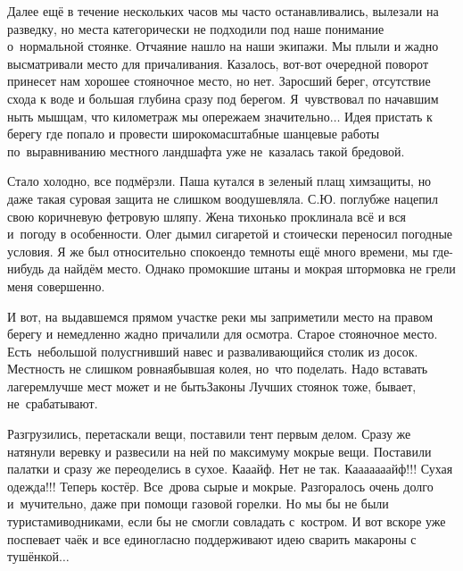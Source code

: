 
Далее ещё в течение нескольких часов мы часто останавливались, вылезали на разведку, но места категорически не подходили под наше понимание о~нормальной стоянке. Отчаяние нашло на наши экипажи. Мы плыли и жадно высматривали место для причаливания. Казалось, вот-вот очередной поворот принесет нам хорошее стояночное место, но нет. Заросший берег, отсутствие схода к воде и большая глубина сразу под берегом. Я~чувствовал по начавшим ныть мышцам, что километраж мы опережаем значительно$\ldots$ Идея пристать к берегу где попало и провести широкомасштабные шанцевые работы по~выравниванию местного ландшафта уже не~казалась такой бредовой.

Стало холодно, все подмёрзли. Паша кутался в зеленый плащ химзащиты, но даже такая суровая защита не слишком воодушевляла. С.Ю. поглубже нацепил свою коричневую фетровую шляпу. Жена тихонько проклинала всё и вся и~погоду в особенности. Олег дымил сигаретой и стоически переносил погодные условия. Я же был относительно спокоен\mdash до темноты ещё много времени, мы где-нибудь да найдём место. Однако промокшие штаны и мокрая штормовка не грели меня совершенно.

И вот, на выдавшемся прямом участке реки мы заприметили место на правом берегу и немедленно жадно причалили для осмотра. Старое стояночное место. Есть~небольшой полусгнивший навес и разваливающийся столик из досок. Местность не слишком ровная\mdash бывшая колея, но~что поделать. Надо вставать лагерем\mdash лучше мест может и не быть\mdash Законы Лучших стоянок тоже, бывает, не~срабатывают.

Разгрузились, перетаскали вещи, поставили тент первым делом. Сразу же натянули веревку и развесили на ней по максимуму мокрые вещи. Поставили палатки и сразу же переоделись в сухое. Ка\sdash а\sdash айф. Нет не так. К\sdash а\sdash а\sdash а\sdash а\sdash а\sdash а\sdash айф!!! Сухая одежда!!! Теперь костёр. Все~дрова сырые и мокрые. Разгоралось очень долго и~мучительно, даже при помощи газовой горелки. Но мы бы не были туристами\sdash водниками, если бы не смогли совладать с~костром. И вот вскоре уже поспевает чаёк и все единогласно поддерживают идею сварить макароны с тушёнкой$\ldots$

